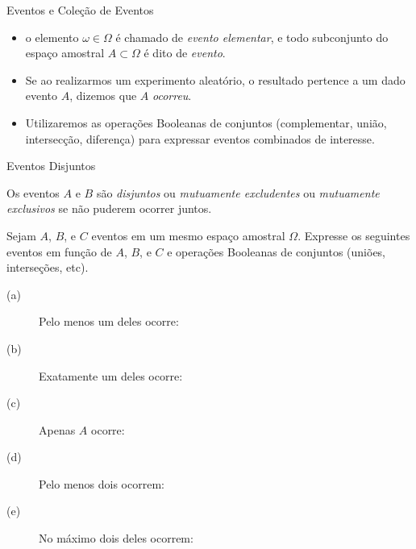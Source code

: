 \begin{frame}

\begin{block}{Eventos e Coleção de Eventos}
	\begin{itemize}
		 \item  o elemento $\omega \in \Omega$ é chamado de
		{\it evento elementar}, e todo subconjunto do espaço amostral  $A\subset\Omega$ é dito de  {\it evento}.
%		
%		
		\item Se ao
		realizarmos um experimento aleatório, o resultado pertence a um dado
		evento $A$, dizemos que $A$ {\em ocorreu}.
		
		\item Utilizaremos as operações Booleanas de conjuntos (complementar,
		união, intersecção, diferença) para expressar eventos combinados de
		interesse.
		
	\end{itemize}
	
\end{block}


\begin{block}{Eventos Disjuntos}
	
	Os eventos $A$ e $B$ s\~ao {\em disjuntos} ou {\em mutuamente excludentes}
	ou {\em mutuamente exclusivos} se n\~ao puderem ocorrer juntos.
\end{block}

	
	\begin{exer}
	Sejam $A$, $B$, e $C$ eventos em um mesmo espaço amostral $\Omega$.
	Expresse os seguintes eventos em função de $A$,
	$B$, e $C$ e operações Booleanas de conjuntos (uniões, interseções, etc).
	\begin{description}
		\item[(a)] Pelo menos um deles ocorre:
		\item[(b)] Exatamente um deles ocorre:
		\item[(c)] Apenas $A$ ocorre:
		\item[(d)] Pelo menos dois ocorrem:
		\item[(e)] No m\'aximo dois deles ocorrem:
	\end{description}
	\end{exer}
	
\end{frame}
